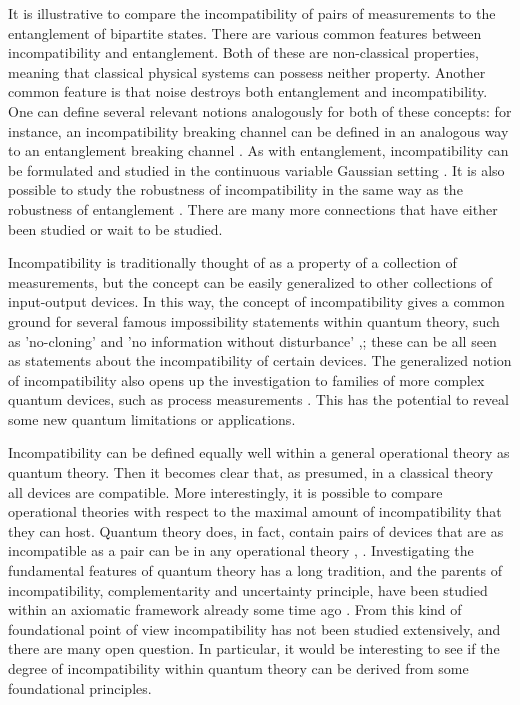 \documentclass[12pt]{iopart}
\theoremstyle{definition}
\begin{document}
It is illustrative to compare the incompatibility of pairs of measurements to the entanglement of bipartite states. 
There are various common features between incompatibility and entanglement. 
Both of these are non-classical properties, meaning that classical physical systems can possess neither property. 
Another common feature is that noise destroys both entanglement and incompatibility.
One can define several relevant notions analogously for both of these concepts:
for instance, an incompatibility breaking channel can be defined in an analogous way to an entanglement breaking channel \cite{HeKiReSc15}.
As with entanglement, incompatibility can be formulated and studied in the continuous variable Gaussian setting \cite{HeKiSc15}.
It is also possible to study the robustness of incompatibility in the same way as the robustness of entanglement \cite{Haapasalo15}.
There are many more connections that have either been studied or wait to be studied.
 
Incompatibility is traditionally thought of as a property of a collection of measurements, but the concept can be easily generalized to other collections of input-output devices. 
In this way, the concept of incompatibility gives a common ground for several famous impossibility statements within quantum theory, such as 'no-cloning' \cite{ScIbGiAc05} and 'no information without disturbance' \cite{Busch09},\cite{QI01Werner}; these can be all seen as statements about the incompatibility of certain devices. 
The generalized notion of incompatibility also opens up the investigation to families of more complex quantum devices, such as process measurements \cite{SeReChZi15}. 
This has the potential to reveal some new quantum limitations or applications.

Incompatibility can be defined equally well within a general operational theory as quantum theory.
Then it becomes clear that, as presumed, in a classical theory all devices are compatible.
More interestingly, it is possible to compare operational theories with respect to the maximal amount of incompatibility that they can host. 
Quantum theory does, in fact, contain pairs of devices that are as incompatible as a pair can be in any operational theory \cite{BuHeScSt13}, \cite{HeScToZi14}.
Investigating the fundamental features of quantum theory has a long tradition, and the parents of incompatibility, complementarity and uncertainty principle, have been studied within an axiomatic framework already some time ago \cite{BuLa80}.  
From this kind of foundational point of view incompatibility has not been  studied extensively, and there are many open question.
In particular, it would be interesting to see if the degree of incompatibility within quantum theory can be derived from some foundational principles. 
\end{document}
